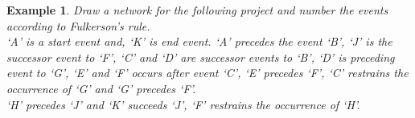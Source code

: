 \documentclass[oneside,11pt,pdftex]{book}%
\numberwithin{equation}{section}
\newtheorem{example}[theorem]{Example}
\numberwithin{section}{chapter}
\numberwithin{equation}{chapter}
\begin{document}
\begin{example}
	Draw a network for the following project and number the events according to Fulkerson's rule.\\
	`A' is a start event and, `K' is end event. `A' precedes the event `B', `J' is the successor event to `F', `C' and `D' are successor events to `B', `D' is preceding event to `G', `E' and `F' occurs after event `C', `E' precedes `F', `C' restrains the occurrence of `G' and `G' precedes `F'.\\ `H' precedes `J' and `K' succeeds `J', `F' restrains the occurrence of `H'.
	\begin{center}
		
		
		
		\begin{tikzpicture}[x=0.75pt,y=0.75pt,yscale=-0.5,xscale=0.5]
			

\end{tikzpicture}
\end{center}
\end{example}
\end{document}
